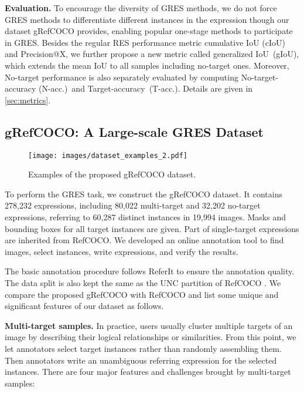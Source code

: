 \documentclass[10pt,twocolumn,letterpaper]{article}
\newcommand{\ntacc}{N-acc.\xspace}
\newcommand{\tacc}{T-acc.\xspace}
\let\oldsubsection\subsection
\renewcommand{\subsection}[1]{\oldsubsection{#1} }
\begin{document}
\textbf{Evaluation.} To encourage the diversity of GRES methods, we do not force GRES methods to differentiate different instances in the expression though our dataset gRefCOCO provides, enabling popular one-stage methods to participate in GRES. Besides the regular RES performance metric cumulative IoU (cIoU) and Precision@X, we further propose a new metric called generalized IoU~(gIoU), which extends the mean IoU to all samples including no-target ones. Moreover, No-target performance is also separately evaluated by computing No-target-accuracy (\ntacc)~and Target-accuracy~(\tacc). Details are given in \cref{sec:metrics}.

\subsection{gRefCOCO: A Large-scale GRES Dataset}


\begin{figure*}[t]
  \begin{center}
     \texttt{[image: images/dataset\_examples\_2.pdf]}
  \end{center}
 \vspace{-0.26in}
  \caption{Examples of the proposed gRefCOCO dataset.}
  \vspace{-0.15in}
  \label{fig:dataset_example}
\end{figure*}


To perform the GRES task, we construct the gRefCOCO dataset.
It 
contains 278,232 expressions, including 80,022 multi-target and 32,202 no-target expressions, referring to 60,287 distinct instances in 19,994 images. 
Masks and bounding boxes for all target instances are given.
Part of single-target expressions are inherited from RefCOCO. 
We developed an online annotation tool to find images, select instances, write expressions, and verify the results. 


The basic annotation procedure follows ReferIt \cite{kazemzadeh-etal-2014-referitgame} to ensure the annotation quality. The data split is also kept the same as the UNC partition of RefCOCO \cite{yu2016modeling}. 
We compare the proposed gRefCOCO with RefCOCO and list some unique and significant features of our dataset as follows.




{\textbf{Multi-target samples.}} 
In practice, users usually cluster multiple targets of an image by describing their logical relationships or similarities. {From this point, we let annotators select target instances rather than randomly assembling them. Then annotators write an unambiguous referring expression for the selected instances.} 
There are four major features and challenges brought by multi-target samples:  
\end{document}
